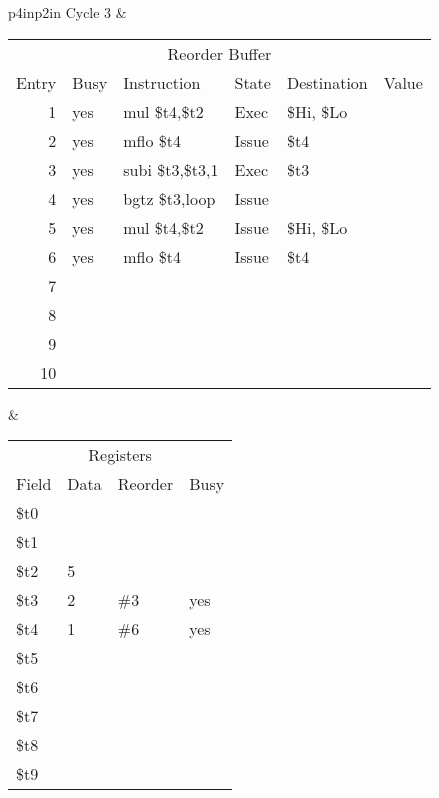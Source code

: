 \noindent
\begin{tabular}{p{4in}p{2in}}
Cycle 3 & \\ \hline \hline

\begin{tabular}{rlp{1in}lll}
\multicolumn{6}{c}{Reorder Buffer} \\
Entry & Busy & Instruction        & State & Destination & Value \\ \hline
 1    & yes  & mul  \$t4,\$t2     & Exec  & \$Hi, \$Lo  &       \\
 2    & yes  & mflo \$t4          & Issue & \$t4        &       \\
 3    & yes  & subi \$t3,\$t3,1   & Exec  & \$t3        &       \\
 4    & yes  & bgtz \$t3,loop     & Issue &             &       \\
 5    & yes  & mul  \$t4,\$t2     & Issue & \$Hi, \$Lo  &       \\
 6    & yes  & mflo \$t4          & Issue & \$t4        &       \\
 7    &      &                    &       &             &       \\
 8    &      &                    &       &             &       \\
 9    &      &                    &       &             &       \\
10    &      &                    &       &             &       \\
\end{tabular} &

\begin{tabular}{llll}
\multicolumn{4}{c}{Registers} \\
Field & Data & Reorder & Busy \\ \hline
\$t0  &      &         &      \\
\$t1  &      &         &      \\
\$t2  & 5    &         &      \\
\$t3  & 2    & \#3     & yes  \\
\$t4  & 1    & \#6     & yes  \\
\$t5  &      &         &      \\
\$t6  &      &         &      \\
\$t7  &      &         &      \\
\$t8  &      &         &      \\
\$t9  &      &         &      \\
\end{tabular} \\


\end{tabular}
